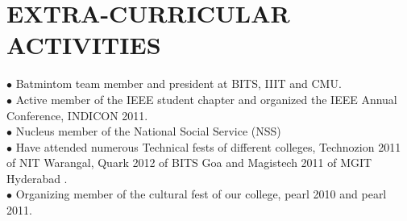 \documentclass[a4paper,10pt]{article}
\begin{document}
\section{EXTRA-CURRICULAR ACTIVITIES} 
$\bullet$ Batmintom team member and president at BITS, IIIT and CMU.\\
$\bullet$ Active member of the IEEE student chapter and organized the IEEE Annual Conference, INDICON 2011.\\
$\bullet$ Nucleus member of the National Social Service (NSS) \\
$\bullet$ Have attended numerous Technical fests of different colleges, Technozion 2011 of NIT Warangal, Quark 2012 of BITS Goa and Magistech 2011 of MGIT Hyderabad .\\
$\bullet$ Organizing member of the cultural fest of our college, pearl 2010 and pearl 2011.\\
\end{document}
